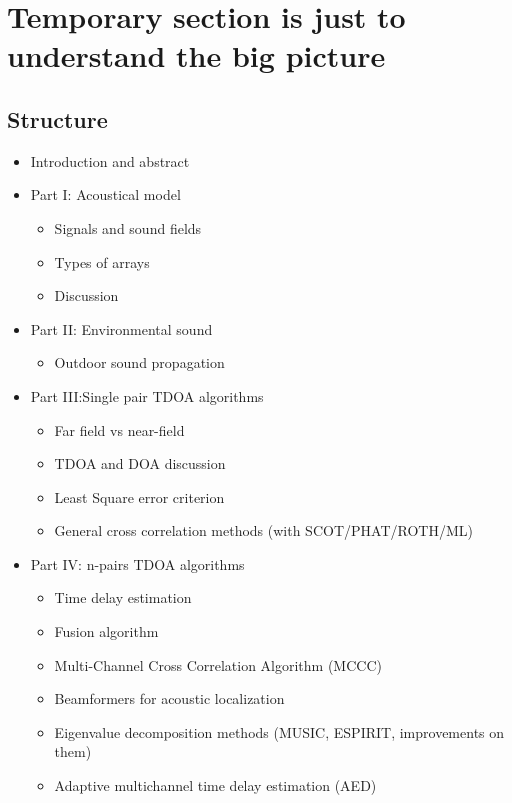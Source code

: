 \section{Temporary section is just to understand the big picture}
 \subsection{Structure}
\begin{itemize}
    \item Introduction and abstract

    \item Part I: Acoustical model 
    \begin{itemize}
        \item Signals and sound fields
        \item Types of arrays
        \item Discussion
    \end{itemize}
    
    \item Part II: Environmental sound 
        \begin{itemize}
            \item Outdoor sound propagation 
        \end{itemize}

    \item Part III:Single pair TDOA algorithms
    \begin{itemize}
        \item Far field vs near-field
        \item TDOA and DOA discussion
        \item Least Square error criterion
        \item General cross correlation methods (with SCOT/PHAT/ROTH/ML)
    \end{itemize}

    \item Part IV: n-pairs TDOA algorithms
    \begin{itemize}
        \item Time delay estimation  
        \item Fusion algorithm 
        \item Multi-Channel Cross Correlation Algorithm (MCCC)
        \item Beamformers for acoustic localization
        \item Eigenvalue decomposition methods (MUSIC, ESPIRIT, improvements on them)
        \item Adaptive multichannel time delay estimation (AED) 
    \end{itemize}
    

\end{itemize}
